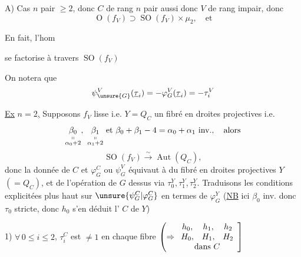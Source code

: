 A) Cas $n$ pair $\geq 2$, donc $C$ de rang $n$ pair aussi donc $V$ de rang impair, donc
\[
\operatorname O(f_V)\supset\operatorname{SO}(f_V)\times\mu_2,\quad\text{et}
\]

En fait, l'hom

se factorise à travers $\operatorname{SO}(f_V)$

On notera que
\[
\psi_{\unsure{G}}^V(\underline{\tau}_i)=-\varphi_G^V(\underline{\tau}_i)=-\tau_i^V
\]

\uline{Ex} \uline{$n=2$,}  Supposons $f_V$ lisse i.e. $Y=Q_C$ un fibré en droites projectives i.e.
\[
\underset{\substack{\shortparallel\\\alpha_0+2}}{\beta_0},\
\underset{\substack{\shortparallel\\\alpha_1+2}}{\beta_1}
\ \text{et}\ \beta_0+\beta_1-4=\alpha_0+\alpha_1\ \text{inv.},\quad\text{alors}
\]
\[
\operatorname{SO}(f_V)\xrightarrow{\sim}\operatorname{Aut}(Q_C),
\]
donc la donnée de $C$ et $\varphi_G^C$ ou $\psi_G^V$ équivaut à  du fibré en droites projectives $Y$ $(=Q_C)$, et de l'opération de $G$ dessus via $\tau_0^Y,\tau_1^Y,\tau_2^Y$. Traduisons les conditions explicitées plus haut sur $\unsure{\psi_G^C|\varphi_G^C}$ en termes de $\varphi_G^Y$ (\uline{NB} ici $\beta_0$ inv. donc $\tau_0$  stricte, donc $h_0$ s'en déduit  l'  $C$ de $Y$)
\scanpage{21}

1) $\forall\,0\leq i\leq2$, $\tau_i^C$ est $\ne 1$ en chaque fibre $\left(\Rightarrow
\begin{array}{ccc}h_0,&h_1,&h_2\\ H_0,&H_1,&H_2\\\multicolumn{3}{c}{\text{dans } C}\end{array}\right]$

